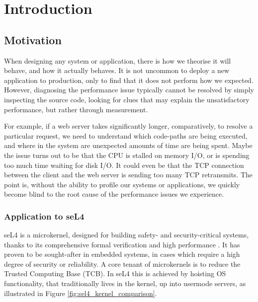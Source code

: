 \chapter{Introduction}\label{ch:intro}

\section{Motivation}

When designing any system or application, there is how we theorise it will behave, and how it actually behaves. It is not uncommon to deploy a new application to production, only to find that it does not perform how we expected. However, diagnosing the performance issue typically cannot be resolved by simply inspecting the source code, looking for clues that may explain the unsatisfactory performance, but rather through measurement.

For example, if a web server takes significantly longer, comparatively, to resolve a particular request, we need to understand which code-paths are being executed, and where in the system are unexpected amounts of time are being spent. Maybe the issue turns out to be that the CPU is stalled on memory I/O, or is spending too much time waiting for disk I/O. It could even be that the TCP connection between the client and the web server is sending too many TCP retransmits. The point is, without the ability to profile our systems or applications, we quickly become blind to the root cause of the performance issues we experience.

\subsection{Application to seL4}

seL4 is a microkernel, designed for building safety- and security-critical systems, thanks to its comprehensive formal verification and high performance \cite{SiteAboutSeL4}. It has proven to be sought-after in embedded systems, in cases which require a high degree of security or reliability. A core tenant of microkernels is to reduce the Trusted Computing Base (TCB). In seL4 this is achieved by hoisting OS functionality, that traditionally lives in the kernel, up into usermode servers, as illustrated in Figure \ref{fig:sel4_kernel_comparison}.

